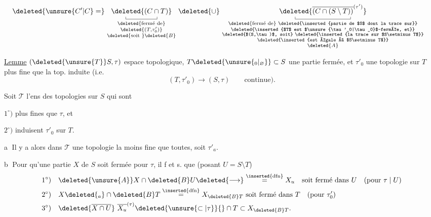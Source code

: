 \[
\begin{aligned}
 &\deleted{\unsure{C'|C}=}\ \underset{\substack{\text{\deleted{fermé de}}\\\deleted{(T,\tau'_0)}\\\text{\deleted{soit }}\deleted{B}}}{\underset{\rule{.35pt}{.35em}\rule{4.4em}{.35pt}\rule{.35pt}{.35em}}{\deleted{(C\cap T)}}}
 \ \deleted{\cup}\ 
 \underset{\substack{\text{\deleted{fermé de} \deleted{\inserted{partie de $S$ dont la trace sur}}}\\
 \text{\deleted{\inserted{$T$ est $\unsure{\tau'_0|\tau_0}$-fermée, et}}}\\
 \text{\deleted{$(S,\tau)$, soit} \deleted{\inserted{la trace sur $S\setminus T$}}}\\
 \text{\deleted{\inserted{est égale à $S\setminus T$}}}\\\deleted{A}}}{\underset{\rule{.35pt}{.35em}\rule{7.8em}{.35pt}\rule{.35pt}{.35em}}{\deleted{\overline{(C\cap(S\setminus T))}^{(\tau')}}}}
\end{aligned}
\]

\uline{Lemme}\quad {} $(\deleted{\unsure{T}}S,\tau)$ espace topologique, $T\deleted{\unsure{_0|_{\varnothing}}}\subset S$ une partie fermée, et $\tau'_0$ une topologie  sur $T$ plus fine que la top. induite (i.e.
\[
 (T,\tau'_0)\mathbin{\longrightarrow}(S,\tau)\qquad\text{continue).}
\]


 Soit \uline{$\mathscr{T}$} l'ens des topologies sur $S$ qui sont

$1^\circ)$ plus fines que $\tau$, et

$2^\circ)$ induisent $\tau'_0$ sur $T$.

\textcircled{a} Il y a alors dans \uline{$\mathscr T$} une topologie la moins fine que toutes, soit $\tau'_{a}$.

\textcircled{b} Pour qu'une partie $X$ de $S$ soit fermée pour $\tau$, il f et s. que (posant $U=S\setminus T$)
\[
\begin{aligned}
1^\circ)\quad &\deleted{\unsure{A}}X\cap \deleted{B}U\deleted{\longrightarrow}\overset{\inserted{\mathrm{dfn}}}{=}X_{u}\quad\text{soit fermé dans }U\quad(\text{pour }\tau\mid U)\\
2^\circ)\quad &X\deleted{_a}\cap\deleted{B}T\overset{\inserted{\mathrm{dfn}}}{=}X_{\deleted{B}T}\ \text{soit fermé dans }T\quad(\text{pour }\tau'_0)\\
3^\circ)\quad &\deleted{\overline{X\cap U}}\ \overline{X_u}^{(\tau)}\deleted{\unsure{\subset|\tau}}{}\cap T\subset X_{\deleted{B}T}.
\end{aligned}
\]
